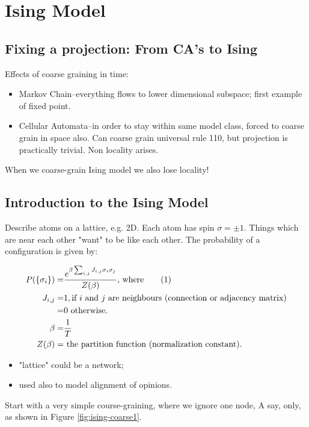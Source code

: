 \documentclass[]{article}
\newcommand\numberthis{\addtocounter{equation}{1}\tag{\theequation}}
\begin{document}
\cite{dedeo2018origin}
\section{Ising Model}

\subsection{Fixing a projection: From CA’s to Ising}
Effects of coarse graining in time:
\begin{itemize}
	\item Markov Chain--everything flows to lower dimensional subspace; first example of fixed point.
	\item Cellular Automata--in order to stay within same model class, forced to coarse grain in space also. Can coarse grain universal rule 110, but projection is practically trivial. Non locality arises. 
\end{itemize}

When we coarse-grain Ising model we also lose locality!
\subsection{Introduction to the Ising Model}

Describe atoms on a lattice, e.g. 2D. Each atom has spin $\sigma=\pm 1$. Things which are near each other "want" to be like each other. The probability of a configuration is given by:

\begin{align*}
P(\{\sigma_i\}) =& \frac{e^{\beta \sum_{i,j} J_{i,j} \sigma_i \sigma_j}}{Z(\beta)}\text{, where} \numberthis \label{eq:coarse_ising:P} \\
J_{i,j} =& 1,\text{if $i$ and $j$ are neighbours (connection or adjacency matrix)}\\
=& 0 \text{ otherwise.}\\
\beta =& \frac{1}{T}\\
Z(\beta) =& \text{ the partition function (normalization constant).}
\end{align*}

\begin{itemize}
	\item "lattice" could be a network;
	\item used also to model alignment of opinions.
\end{itemize}

Start with a very simple course-graining, where we ignore one node, A say, only, as shown in Figure \ref{fig:ising-coarse1}.
\end{document}
